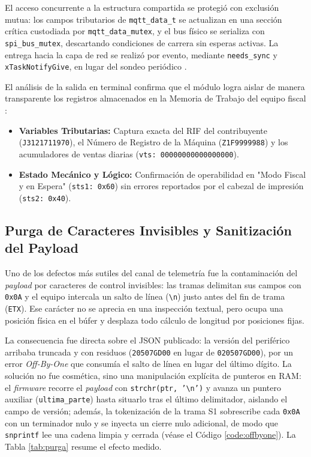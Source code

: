 \par El acceso concurrente a la estructura compartida se protegió con exclusión mutua: los campos tributarios de \texttt{mqtt\_data\_t} se actualizan en una sección crítica custodiada por \texttt{mqtt\_data\_mutex}, y el bus físico se serializa con \texttt{spi\_bus\_mutex}, descartando condiciones de carrera sin esperas activas. La entrega hacia la capa de red se realizó por evento, mediante \texttt{needs\_sync} y \texttt{xTaskNotifyGive}, en lugar del sondeo periódico \cite{FreeRTOS_Kernel_Ref}.\\

\par El análisis de la salida en terminal confirma que el módulo logra aislar de manera transparente los registros almacenados en la Memoria de Trabajo del equipo fiscal \cite{TheFactoryHKA_Manual_Protocolos}:
\begin{itemize}
    \item \textbf{Variables Tributarias:} Captura exacta del RIF del contribuyente (\texttt{J3121711970}), el Número de Registro de la Máquina (\texttt{Z1F9999988}) y los acumuladores de ventas diarias (\texttt{vts: 00000000000000000}).
    \item \textbf{Estado Mecánico y Lógico:} Confirmación de operabilidad en "Modo Fiscal y en Espera" (\texttt{sts1: 0x60}) sin errores reportados por el cabezal de impresión (\texttt{sts2: 0x40}).
\end{itemize}

\subsection{Purga de Caracteres Invisibles y Sanitización del Payload}

\par Uno de los defectos más sutiles del canal de telemetría fue la contaminación del \textit{payload} por caracteres de control invisibles: las tramas delimitan sus campos con \texttt{0x0A} y el equipo intercala un salto de línea (\texttt{\textbackslash n}) justo antes del fin de trama (\texttt{ETX}). Ese carácter no se aprecia en una inspección textual, pero ocupa una posición física en el búfer y desplaza todo cálculo de longitud por posiciones fijas.\\

\par La consecuencia fue directa sobre el JSON publicado: la versión del periférico arribaba truncada y con residuos (\texttt{20507GD00} en lugar de \texttt{020507GD00}), por un error \textit{Off-By-One} que consumía el salto de línea en lugar del último dígito. La solución no fue cosmética, sino una manipulación explícita de punteros en RAM: el \textit{firmware} recorre el \textit{payload} con \texttt{strchr(ptr, '\textbackslash n')} y avanza un puntero auxiliar (\texttt{ultima\_parte}) hasta situarlo tras el último delimitador, aislando el campo de versión; además, la tokenización de la trama S1 sobrescribe cada \texttt{0x0A} con un terminador nulo y se inyecta un cierre nulo adicional, de modo que \texttt{snprintf} lee una cadena limpia y cerrada (véase el Código \ref{code:offbyone}). La Tabla \ref{tab:purga} resume el efecto medido.\\

